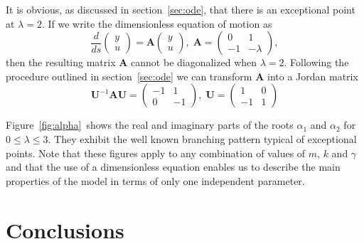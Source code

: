 \documentclass{article}
\begin{document}
It is obvious, as discussed in section~\ref{sec:ode}, that there is an
exceptional point at $\lambda =2$. If we write the dimensionless equation of
motion as
\begin{equation}
\frac{d}{ds}\left(
\begin{array}{l}
y \\
u
\end{array}
\right) =\mathbf{A}\left(
\begin{array}{l}
y \\
u
\end{array}
\right) ,\;\mathbf{A}=\left(
\begin{array}{cc}
0 & 1 \\
-1 & -\lambda
\end{array}
\right) ,
\end{equation}
then the resulting matrix $\mathbf{A}$ cannot be diagonalized when $\lambda
=2$. Following the procedure outlined in section~\ref{sec:ode} we can
transform $\mathbf{A}$ into a Jordan matrix
\begin{equation}
\mathbf{U}^{-1}\mathbf{AU=}\left(
\begin{array}{cc}
-1 & 1 \\
0 & -1
\end{array}
\right) ,\;\mathbf{U}=\left(
\begin{array}{cc}
1 & 0 \\
-1 & 1
\end{array}
\right)
\end{equation}

Figure~\ref{fig:alpha}~shows the real and imaginary parts of the roots $%
\alpha _{1}$ and $\alpha _{2}$ for $0\leq \lambda \leq 3$. They exhibit the
well known branching pattern typical of exceptional points\cite{H04}. Note
that these figures apply to any combination of values of $m$, $k$ and $%
\gamma $ and that the use of a dimensionless equation enables us to describe
the main properties of the model in terms of only one independent parameter.

\section{Conclusions}

\label{sec:conclusions}
\end{document}
